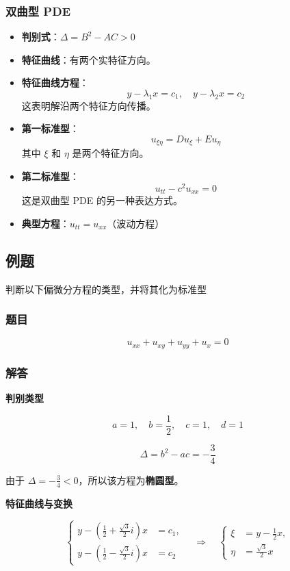 \subsubsection{双曲型 PDE}
\begin{itemize}
    \item \textbf{判别式}：$\Delta = B^2 - AC > 0$  
    \item \textbf{特征曲线}：有两个实特征方向。  
    \item \textbf{特征曲线方程}：
    \[
    y - \lambda_1 x = c_1, \quad y - \lambda_2 x = c_2
    \]
    这表明解沿两个特征方向传播。
    \item \textbf{第一标准型}：
    \[
    u_{\xi \eta} = D u_{\xi} + E u_{\eta}
    \]
    其中 $\xi$ 和 $\eta$ 是两个特征方向。
    \item \textbf{第二标准型}：
    \[
    u_{tt} - c^2 u_{xx} = 0
    \]
    这是双曲型 PDE 的另一种表达方式。
    \item \textbf{典型方程}：$u_{tt} = u_{xx}$（波动方程）
\end{itemize}

\subsection{例题}
判断以下偏微分方程的类型，并将其化为标准型

\subsubsection*{题目}
\[
u_{xx} + u_{xy} + u_{yy} + u_x = 0
\]

\subsubsection*{解答}
\textbf{判别类型}

\[
a = 1, \quad b = \frac{1}{2}, \quad c = 1, \quad d = 1
\]

\[
\Delta = b^2 - ac = -\frac{3}{4}
\]

由于 $\Delta = -\frac{3}{4} < 0$，所以该方程为\textbf{椭圆型}。

\textbf{特征曲线与变换}

\[
\left\{
\begin{aligned}
y - \left(\frac{1}{2} + \frac{\sqrt{3}}{2} i\right) x &= c_1, \\
y - \left(\frac{1}{2} - \frac{\sqrt{3}}{2} i\right) x &= c_2
\end{aligned}
\right.
\quad \Longrightarrow \quad
\left\{
\begin{aligned}
\xi &= y - \frac{1}{2}x, \\
\eta &= \frac{\sqrt{3}}{2}x
\end{aligned}
\right.
\]

